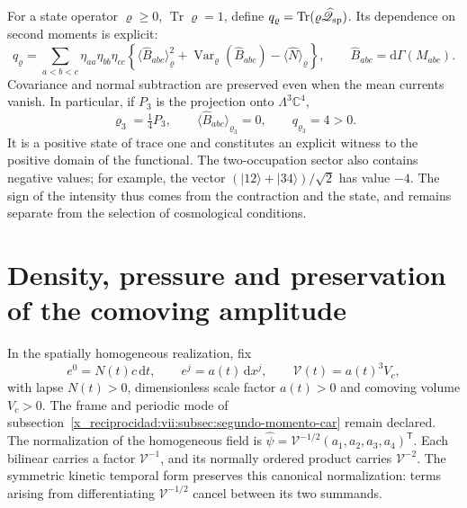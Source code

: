 For a state operator \(\varrho\geq0\),
\(\operatorname{Tr}\varrho=1\), define
\(q_\varrho=\operatorname{Tr}(\varrho\widehat{\mathscr Q}_{\rm sp})\).
Its dependence on second moments is explicit:
\begin{equation}
 q_\varrho=\sum_{a<b<c}\eta_{aa}\eta_{bb}\eta_{cc}
 \left\{
  \langle\widehat B_{abc}\rangle_\varrho^2
  +\operatorname{Var}_\varrho(\widehat B_{abc})
  -\langle\widehat N\rangle_\varrho
 \right\},\qquad
 \widehat B_{abc}=\mathrm d\Gamma(M_{abc}).
 \label{x_reciprocidad:vii:eq:covarianza-espin-material}
\end{equation}
Covariance and normal subtraction are preserved even when
the mean currents vanish. In particular, if \(P_3\) is the
projection onto \(\Lambda^3\mathbb C^4\),
\begin{equation}
 \varrho_3=\tfrac14P_3,\qquad
 \langle\widehat B_{abc}\rangle_{\varrho_3}=0,\qquad
 q_{\varrho_3}=4>0.
 \label{x_reciprocidad:vii:eq:testigo-positivo-espin}
\end{equation}
It is a positive state of trace one and constitutes an explicit witness
to the positive domain of the functional. The two-occupation sector
also contains negative values; for example, the vector
\((|12\rangle+|34\rangle)/\sqrt2\) has value \(-4\).
The sign of the intensity thus comes from the contraction and the
state, and remains separate from the selection of cosmological conditions.

\section{Density, pressure and preservation of the comoving amplitude}
\label{x_reciprocidad:vii:subsec:amplitud-espinorial-comovil}

In the spatially homogeneous realization, fix
\[
 e^0=N(t)c\,\mathrm dt,\qquad e^j=a(t)\,\mathrm dx^j,
 \qquad \mathcal V(t)=a(t)^3V_c,
\]
with lapse \(N(t)>0\), dimensionless scale factor \(a(t)>0\)
and comoving volume \(V_c>0\). The frame and periodic mode of
subsection~\ref{x_reciprocidad:vii:subsec:segundo-momento-car} remain declared.
The normalization of the homogeneous field is
\(\widehat\psi=\mathcal V^{-1/2}(a_1,a_2,a_3,a_4)^{\mathsf T}\).
Each bilinear carries a factor \(\mathcal V^{-1}\), and its normally
ordered product carries \(\mathcal V^{-2}\). The symmetric kinetic
temporal form preserves this canonical normalization: terms
arising from differentiating \(\mathcal V^{-1/2}\) cancel between
its two summands.

